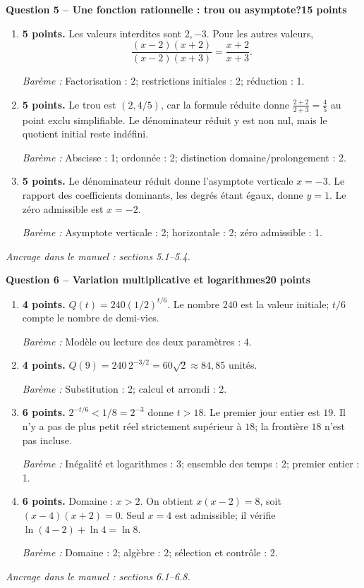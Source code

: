 \documentclass[11pt,a4paper]{article}
\begin{document}
\newpage
{\large\bfseries Question 5 -- Une fonction rationnelle : trou ou asymptote?}\hfill\textbf{15 points}\par
\begin{enumerate}
\item \textbf{5 points.} Les valeurs interdites sont \(2,-3\). Pour les autres valeurs, \[\frac{(x-2)(x+2)}{(x-2)(x+3)}=\frac{x+2}{x+3}.\]
\par{\small\textit{Barème : }Factorisation : 2; restrictions initiales : 2; réduction : 1.}
\item \textbf{5 points.} Le trou est \((2,4/5)\), car la formule réduite donne \(\frac{2+2}{2+3}=\frac45\) au point exclu simplifiable. Le dénominateur réduit y est non nul, mais le quotient initial reste indéfini.
\par{\small\textit{Barème : }Abscisse : 1; ordonnée : 2; distinction domaine/prolongement : 2.}
\item \textbf{5 points.} Le dénominateur réduit donne l’asymptote verticale \(x=-3\). Le rapport des coefficients dominants, les degrés étant égaux, donne \(y=1\). Le zéro admissible est \(x=-2\).
\par{\small\textit{Barème : }Asymptote verticale : 2; horizontale : 2; zéro admissible : 1.}
\end{enumerate}
\vfill {\small\textit{Ancrage dans le manuel : sections 5.1--5.4.}}

\newpage
{\large\bfseries Question 6 -- Variation multiplicative et logarithmes}\hfill\textbf{20 points}\par
\begin{enumerate}
\item \textbf{4 points.} \(Q(t)=240(1/2)^{t/6}\). Le nombre \(240\) est la valeur initiale; \(t/6\) compte le nombre de demi-vies.
\par{\small\textit{Barème : }Modèle ou lecture des deux paramètres : 4.}
\item \textbf{4 points.} \(Q(9)=240\,2^{-3/2}=60\sqrt2\approx84{,}85\) unités.
\par{\small\textit{Barème : }Substitution : 2; calcul et arrondi : 2.}
\item \textbf{6 points.} \(2^{-t/6}<1/8=2^{-3}\) donne \(t>18\). Le premier jour entier est \(19\). Il n’y a pas de plus petit réel strictement supérieur à \(18\); la frontière \(18\) n’est pas incluse.
\par{\small\textit{Barème : }Inégalité et logarithmes : 3; ensemble des temps : 2; premier entier : 1.}
\item \textbf{6 points.} Domaine : \(x>2\). On obtient \(x(x-2)=8\), soit \((x-4)(x+2)=0\). Seul \(x=4\) est admissible; il vérifie \(\ln(4-2)+\ln4=\ln8\).
\par{\small\textit{Barème : }Domaine : 2; algèbre : 2; sélection et contrôle : 2.}
\end{enumerate}
\vfill {\small\textit{Ancrage dans le manuel : sections 6.1--6.8.}}
\end{document}
